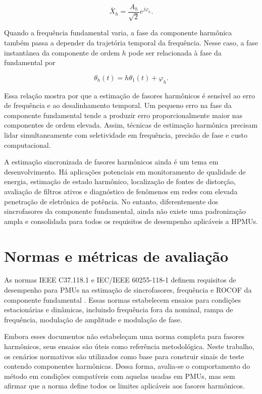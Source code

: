 \begin{equation}
\bar{X}_h = \frac{A_h}{\sqrt{2}}e^{j\varphi_h}.
\label{eq:cap2_fasor_harmonico}
\end{equation}

Quando a frequência fundamental varia, a fase da componente harmônica também passa a depender da trajetória temporal da frequência. Nesse caso, a fase instantânea da componente de ordem $h$ pode ser relacionada à fase da fundamental por

\begin{equation}
\theta_h(t) = h\theta_1(t) + \varphi_h.
\label{eq:cap2_fase_harmonico}
\end{equation}

Essa relação mostra por que a estimação de fasores harmônicos é sensível ao erro de frequência e ao desalinhamento temporal. Um pequeno erro na fase da componente fundamental tende a produzir erro proporcionalmente maior nas componentes de ordem elevada. Assim, técnicas de estimação harmônica precisam lidar simultaneamente com seletividade em frequência, precisão de fase e custo computacional.

A estimação sincronizada de fasores harmônicos ainda é um tema em desenvolvimento. Há aplicações potenciais em monitoramento de qualidade de energia, estimação de estado harmônico, localização de fontes de distorção, avaliação de filtros ativos e diagnóstico de fenômenos em redes com elevada penetração de eletrônica de potência. No entanto, diferentemente dos sincrofasores da componente fundamental, ainda não existe uma padronização ampla e consolidada para todos os requisitos de desempenho aplicáveis a HPMUs.

\section{Normas e métricas de avaliação}

As normas IEEE C37.118.1 e IEC/IEEE 60255-118-1 definem requisitos de desempenho para PMUs na estimação de sincrofasores, frequência e ROCOF da componente fundamental \cite{ieee2011,ieee2014,iec60255}. Essas normas estabelecem ensaios para condições estacionárias e dinâmicas, incluindo frequência fora da nominal, rampa de frequência, modulação de amplitude e modulação de fase.

Embora esses documentos não estabeleçam uma norma completa para fasores harmônicos, seus ensaios são úteis como referência metodológica. Neste trabalho, os cenários normativos são utilizados como base para construir sinais de teste contendo componentes harmônicas. Dessa forma, avalia-se o comportamento do método em condições compatíveis com aquelas usadas em PMUs, mas sem afirmar que a norma define todos os limites aplicáveis aos fasores harmônicos.

